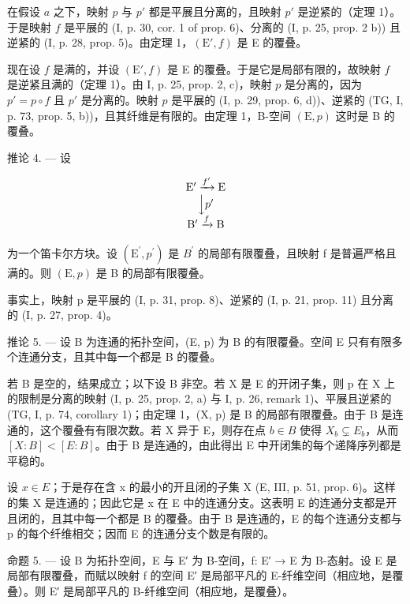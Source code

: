 在假设 \(a\) 之下，映射 \(p\) 与 \(p'\) 都是平展且分离的，且映射 \(p'\) 是逆紧的（定理 1）。于是映射 \(f\) 是平展的 (I, p. 30, cor. 1 of prop. 6)、分离的 (I, p. 25, prop. 2 b)) 且逆紧的 (I, p. 28, prop. 5)。由定理 1，\((\mathrm{E}', f)\) 是 E 的覆叠。

现在设 \(f\) 是满的，并设 \((\mathrm{E}', f)\) 是 E 的覆叠。于是它是局部有限的，故映射 \(f\) 是逆紧且满的（定理 1）。由 I, p. 25, prop. 2, c)，映射 \(p\) 是分离的，因为 \(p' = p \circ f\) 且 \(p'\) 是分离的。映射 \(p\) 是平展的 (I, p. 29, prop. 6, d))、逆紧的 (TG, I, p. 73, prop. 5, b))，且其纤维是有限的。由定理 1，B-空间 \((\mathrm{E}, p)\) 这时是 B 的覆叠。

推论 4. --- 设

\[
\begin{array}{c} \mathrm{E} ^ {\prime} \xrightarrow {f ^ {\prime}} \mathrm{E} \\ \Big \downarrow p ^ {\prime} \\ \mathrm{B} ^ {\prime} \xrightarrow {f} \mathrm{B} \end{array}
\]

为一个笛卡尔方块。设 \((\mathrm{E}^{\prime}, p^{\prime})\) 是 \(B^{\prime}\) 的局部有限覆叠，且映射 f 是普遍严格且满的。则 \((\mathrm{E}, p)\) 是 B 的局部有限覆叠。

事实上，映射 p 是平展的 (I, p. 31, prop. 8)、逆紧的 (I, p. 21, prop. 11) 且分离的 (I, p. 27, prop. 4)。

推论 5. --- 设 B 为连通的拓扑空间，(E, p) 为 B 的有限覆叠。空间 E 只有有限多个连通分支，且其中每一个都是 B 的覆叠。

若 B 是空的，结果成立；以下设 B 非空。若 X 是 E 的开闭子集，则 p 在 X 上的限制是分离的映射 (I, p. 25, prop. 2, a) 与 I, p. 26, remark 1)、平展且逆紧的 (TG, I, p. 74, corollary 1)；由定理 1，(X, p) 是 B 的局部有限覆叠。由于 B 是连通的，这个覆叠有有限次数。若 X 异于 E，则存在点 \(b \in B\) 使得 \(X_{b} \subsetneq E_{b}\)，从而 \([X:B] < [E:B]\)。由于 B 是连通的，由此得出 E 中开闭集的每个递降序列都是平稳的。

设 \(x \in E\)；于是存在含 x 的最小的开且闭的子集 X (E, III, p. 51, prop. 6)。这样的集 X 是连通的；因此它是 x 在 E 中的连通分支。这表明 E 的连通分支都是开且闭的，且其中每一个都是 B 的覆叠。由于 B 是连通的，E 的每个连通分支都与 p 的每个纤维相交；因而 E 的连通分支个数是有限的。

命题 5. — 设 B 为拓扑空间，E 与 E′ 为 B-空间，f: E′ → E 为 B-态射。设 E 是局部有限覆叠，而赋以映射 f 的空间 E′ 是局部平凡的 E-纤维空间（相应地，是覆叠）。则 E′ 是局部平凡的 B-纤维空间（相应地，是覆叠）。

